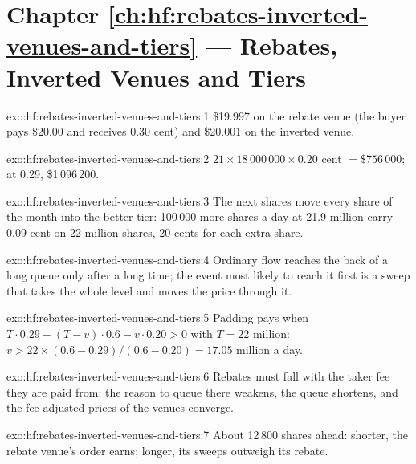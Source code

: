 \section*{Chapter \ref{ch:hf:rebates-inverted-venues-and-tiers} --- Rebates, Inverted Venues and Tiers}

\begin{solution}{exo:hf:rebates-inverted-venues-and-tiers:1}
\$19.997 on the rebate venue (the buyer pays \$20.00 and receives 0.30 cent) and \$20.001 on the inverted venue.
\end{solution}

\begin{solution}{exo:hf:rebates-inverted-venues-and-tiers:2}
$21\times18\,000\,000\times0.20$ cent $=\$756\,000$; at 0.29, \$1\,096\,200.
\end{solution}

\begin{solution}{exo:hf:rebates-inverted-venues-and-tiers:3}
The next shares move every share of the month into the better tier: 100\,000 more shares a day at 21.9 million carry 0.09 cent on 22 million shares,
20 cents for each extra share.
\end{solution}

\begin{solution}{exo:hf:rebates-inverted-venues-and-tiers:4}
Ordinary flow reaches the back of a long queue only after a long time; the event most likely to reach it first is a sweep that takes the whole level
and moves the price through it.
\end{solution}

\begin{solution}{exo:hf:rebates-inverted-venues-and-tiers:5}
Padding pays when $T\cdot0.29-(T-v)\cdot0.6-v\cdot0.20>0$ with $T=22$ million: $v>22\times(0.6-0.29)/(0.6-0.20)=17.05$ million a day.
\end{solution}

\begin{solution}{exo:hf:rebates-inverted-venues-and-tiers:6}
Rebates must fall with the taker fee they are paid from: the reason to queue there weakens, the queue shortens, and the fee-adjusted prices of the
venues converge.
\end{solution}

\begin{solution}{exo:hf:rebates-inverted-venues-and-tiers:7}
About 12\,800 shares ahead: shorter, the rebate venue's order earns; longer, its sweeps outweigh its rebate.
\end{solution}

